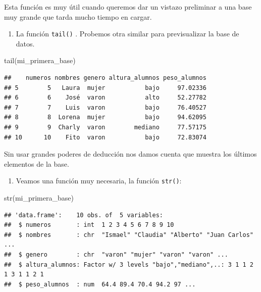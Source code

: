 \documentclass[
]{book}
\newenvironment{Shaded}{\begin{snugshade}}{\end{snugshade}}
\newcommand{\FunctionTok}[1]{\textcolor[rgb]{0.00,0.00,0.00}{#1}}
\newcommand{\NormalTok}[1]{#1}
\providecommand{\tightlist}{%
  \setlength{\itemsep}{0pt}\setlength{\parskip}{0pt}}
\begin{document}
Esta función es muy útil cuando queremos dar un vistazo preliminar a una base muy grande que tarda mucho tiempo en cargar.

\begin{enumerate}
\def\labelenumi{\arabic{enumi}.}
\setcounter{enumi}{1}
\tightlist
\item
  La función \texttt{tail()} . Probemos otra similar para previsualizar la base de datos.
\end{enumerate}

\begin{Shaded}
\begin{Highlighting}[]
\FunctionTok{tail}\NormalTok{(mi\_primera\_base)}
\end{Highlighting}
\end{Shaded}

\begin{verbatim}
##    numeros nombres genero altura_alumnos peso_alumnos
## 5        5   Laura  mujer           bajo     97.02336
## 6        6    José  varon           alto     52.27782
## 7        7    Luis  varon           bajo     76.40527
## 8        8  Lorena  mujer           bajo     94.62095
## 9        9  Charly  varon        mediano     77.57175
## 10      10    Fito  varon           bajo     72.83074
\end{verbatim}

Sin usar grandes poderes de deducción nos damos cuenta que muestra los últimos elementos de la base.

\begin{enumerate}
\def\labelenumi{\arabic{enumi}.}
\setcounter{enumi}{2}
\tightlist
\item
  Veamos una función muy necesaria, la función \texttt{str()}:
\end{enumerate}

\begin{Shaded}
\begin{Highlighting}[]
\FunctionTok{str}\NormalTok{(mi\_primera\_base)}
\end{Highlighting}
\end{Shaded}

\begin{verbatim}
## 'data.frame':    10 obs. of  5 variables:
##  $ numeros       : int  1 2 3 4 5 6 7 8 9 10
##  $ nombres       : chr  "Ismael" "Claudia" "Alberto" "Juan Carlos" ...
##  $ genero        : chr  "varon" "mujer" "varon" "varon" ...
##  $ altura_alumnos: Factor w/ 3 levels "bajo","mediano",..: 3 1 1 2 1 3 1 1 2 1
##  $ peso_alumnos  : num  64.4 89.4 70.4 94.2 97 ...
\end{verbatim}
\end{document}
